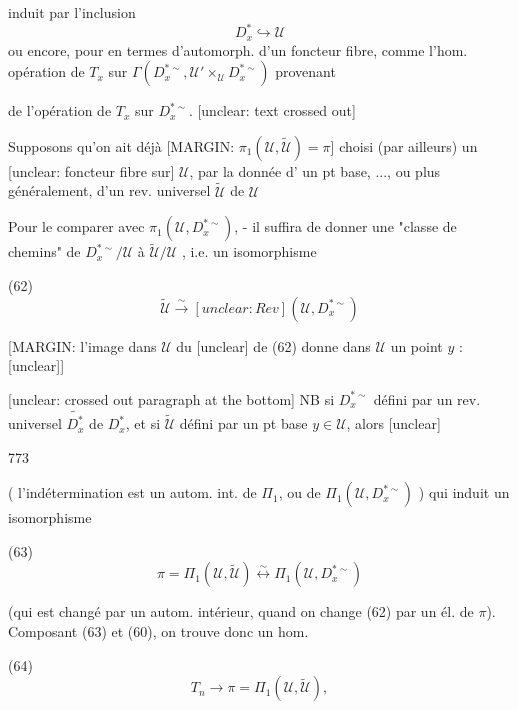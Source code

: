 \newpage


induit par l'inclusion
$$D_x^* \hookrightarrow \mathcal{U}$$
ou encore, pour en termes d'automorph. d'un
foncteur fibre, comme l'hom. opération de
$T_x$ sur $\Gamma(D_x^{*\sim}, \mathcal{U}' \times_\mathcal{U} D_x^{*\sim})$ provenant


de l'opération de $T_x$ sur
$D_x^{*\sim}$. [unclear: text crossed out]

Supposons qu'on ait déjà
[MARGIN: $\pi_1(\mathcal{U},\tilde{\mathcal{U}}) = \pi$]
choisi (par ailleurs) un [unclear: foncteur fibre sur] $\mathcal{U}$,
par la donnée d' un pt base, ..., ou plus
généralement, d'un rev. universel $\tilde{\mathcal{U}}$ de $\mathcal{U}$

Pour le comparer avec $\pi_1(\mathcal{U}, D_x^{*\sim})$,
- il suffira de donner une "classe de chemins"
de $D_x^{*\sim} / \mathcal{U}$ à $\tilde{\mathcal{U}} / \mathcal{U}$ , i.e. un
isomorphisme

(62) $$ \tilde{\mathcal{U}} \xrightarrow{\sim} [unclear: Rev](\mathcal{U}, D_x^{*\sim}) $$

[MARGIN: l'image dans $\mathcal{U}$ du [unclear] de (62) donne dans $\mathcal{U}$ un point $y$ : [unclear]]

[unclear: crossed out paragraph at the bottom]
NB si $D_x^{*\sim}$ défini
par un rev. universel $\widetilde{D_x^*}$
de $D_x^*$, et si $\tilde{\mathcal{U}}$
défini par un pt base $y \in \mathcal{U}$,
alors [unclear]

\newpage


773

( l'indétermination est un autom.
int. de $\Pi_1$, ou de $\Pi_1(\mathcal{U}, D_x^{* \sim})$ ) qui
induit un isomorphisme

(63) $$ \pi = \Pi_1(\mathcal{U}, \tilde{\mathcal{U}}) \overset{\sim}{\longleftrightarrow} \Pi_1(\mathcal{U}, D_x^{* \sim}) $$

(qui est changé par un autom. intérieur,
quand on change (62) par un él. de $\pi$).
Composant (63) et (60), on trouve donc
un hom.

(64) $$ T_n \longrightarrow \pi = \Pi_1(\mathcal{U}, \tilde{\mathcal{U}}) , $$

